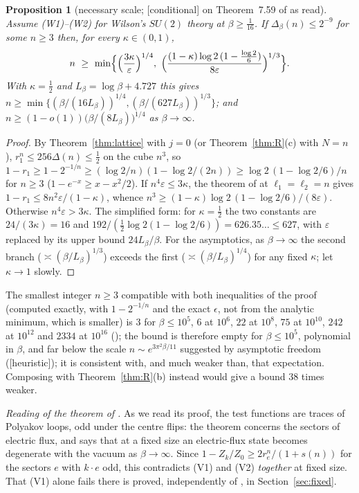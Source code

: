\documentclass[11pt,a4paper]{article}
\theoremstyle{plain}
\newtheorem{proposition}[theorem]{Proposition}
\theoremstyle{definition}
\theoremstyle{remark}
\numberwithin{equation}{section}
\newcommand{\st}[1]{\textsf{[#1]}}
\begin{document}
\begin{proposition}[necessary scale; \st{conditional} on Theorem~7.59 of \cite{BB26v5} as read]\label{prop:scale}
Assume (W1)--(W2) for Wilson's $SU(2)$ theory at $\beta\ge\frac1{16}$. If $\Delta_\beta(n)\le2^{-9}$ for some $n\ge3$ then, for every $\kappa\in(0,1)$,
\[
n\ \ge\ \min\Bigl\{\Bigl(\frac{3\kappa}{\varepsilon}\Bigr)^{1/4},\ \Bigl(\frac{(1-\kappa)\log2\,(1-\frac{\log2}6)}{8\varepsilon}\Bigr)^{1/3}\Bigr\}.
\]
With $\kappa=\frac12$ and $L_\beta=\log\beta+4.727$ this gives $n\ge\min\{(\beta/(16L_\beta))^{1/4},(\beta/(627L_\beta))^{1/3}\}$; and $n\ge(1-o(1))\bigl(\beta/(8L_\beta)\bigr)^{1/4}$ as $\beta\to\infty$.
\end{proposition}
\begin{proof}
By Theorem~\ref{thm:lattice} with $j=0$ (or Theorem~\ref{thm:R}(c) with $N=n$), $r_1^n\le256\Delta(n)\le\frac12$ on the cube $n^3$, so $1-r_1\ge1-2^{-1/n}\ge(\log2/n)(1-\log2/(2n))\ge\log2\,(1-\log2/6)/n$ for $n\ge3$ ($1-e^{-x}\ge x-x^2/2$). If $n^4\varepsilon\le3\kappa$, the theorem of \cite{BB26v5} at $\ell_1=\ell_2=n$ gives $1-r_1\le8n^2\varepsilon/(1-\kappa)$, whence $n^3\ge(1-\kappa)\log2\,(1-\log2/6)/(8\varepsilon)$. Otherwise $n^4\varepsilon>3\kappa$. The simplified form: for $\kappa=\frac12$ the two constants are $24/(3\kappa)=16$ and $192/(\frac12\log2(1-\log2/6))=626.35\ldots\le627$, with $\varepsilon$ replaced by its upper bound $24L_\beta/\beta$. For the asymptotics, as $\beta\to\infty$ the second branch ($\asymp(\beta/L_\beta)^{1/3}$) exceeds the first ($\asymp(\beta/L_\beta)^{1/4}$) for any fixed $\kappa$; let $\kappa\to1$ slowly.
\end{proof}
The smallest integer $n\ge3$ compatible with both inequalities of the proof (computed exactly, with $1-2^{-1/n}$ and the exact $\epsilon$, not from the analytic minimum, which is smaller) is $3$ for $\beta\le10^5$, $6$ at $10^6$, $22$ at $10^8$, $75$ at $10^{10}$, $242$ at $10^{12}$ and $2334$ at $10^{16}$ (); the bound is therefore empty for $\beta\le10^5$, polynomial in $\beta$, and far below the scale $n\sim e^{3\pi^2\beta/11}$ suggested by asymptotic freedom (\st{heuristic}); it is consistent with, and much weaker than, that expectation. Composing \cite[Cor.~7.60]{BB26v5} with Theorem~\ref{thm:R}(b) instead would give a bound $38$ times weaker.

\emph{Reading of the theorem of \cite{BB26v5}.} As we read its proof, the test functions are traces of Polyakov loops, odd under the centre flips: the theorem concerns the sectors of electric flux, and says that at a fixed size an electric-flux state becomes degenerate with the vacuum as $\beta\to\infty$. Since $1-Z_k/Z_0\ge2r_e^n/(1+s(n))$ for the sectors $e$ with $k\cdot e$ odd, this contradicts (V1) and (V2) \emph{together} at fixed size. That (V1) alone fails there is proved, independently of \cite{BB26v5}, in Section~\ref{sec:fixed}.
\end{document}
